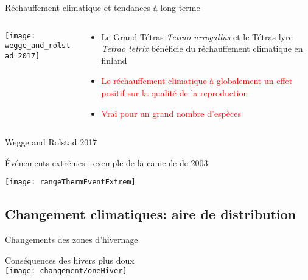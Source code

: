\documentclass[10pt]{beamer}
\begin{document}
\begin{frame}{Réchauffement climatique et tendances à long terme}
  \begin{columns}[c]
    \begin{column}[c]{0.5\textwidth}
      \begin{center}
   \texttt{[image: wegge\_and\_rolstad\_2017]}\\
 \end{center}
    \end{column}
    \begin{column}[c]{0.5\textwidth}
   
    \begin{itemize}
    \item <2> Le Grand Tétras \textit{Tetrao urrogallus} et le Tétras lyre \textit{Tetrao tetrix} bénéficie du réchauffement climatique en finland
    \item <3> \textcolor{red}{Le réchauffement climatique à globalement un effet positif sur la qualité de la reproduction}
     \item <3> \textcolor{red}{Vrai pour un grand nombre d'espèces}
    
   \end{itemize}
    
    \end{column}
  \end{columns}

   \begin{tiny}
    Wegge and Rolstad 2017
  \end{tiny}

\end{frame}




\begin{frame}{Événements extrêmes : \small{exemple de la canicule de 2003}}
  \begin{center}
   \texttt{[image: rangeThermEventExtrem]}
  \end{center}
  \end{frame}

  
  
  
\subsection{Changement climatiques: aire de distribution}

\begin{frame}{Changements des zones d’hivernage}
  \begin{center}
   Conséquences des hivers plus doux \\
  \vspace{10pt}
  \texttt{[image: changementZoneHiver]}
  \end{center}
\end{frame}
\end{document}
